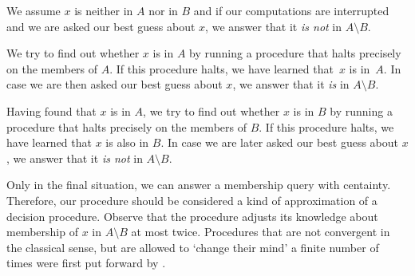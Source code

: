 \begin{codelisting}
\item
  We assume $x$ is neither in $A$ nor in $B$ and if our computations are interrupted and we are asked our best guess about $x$, we answer that it \emph{is not} in $A \setminus B$.
\item
  We try to find out whether $x$ is in $A$ by running a procedure that halts precisely on the members of $A$.
  If this procedure halts, we have learned that~$x$ is in~$A$.
  In case we are then asked our best guess about $x$, we answer that it \emph{is} in $A \setminus B$.
\item
  Having found that $x$ is in $A$, we try to find out whether $x$ is in $B$ by running a procedure that halts precisely on the members of $B$.
  If this procedure halts, we have learned that $x$ is also in $B$.
  In case we are later asked our best guess about $x$, we answer that it \emph{is not} in $A \setminus B$.
\end{codelisting}
Only in the final situation, we can answer a membership query with centainty.
Therefore, our procedure should be considered a kind of approximation of a decision procedure.
Observe that the procedure adjusts its knowledge about membership of $x$ in $A \setminus B$ at most twice.
Procedures that are not convergent in the classical sense, but are allowed to `change their mind' a finite number of times were first put forward by \textcite{putnam1965trial,gold1965limiting}.

